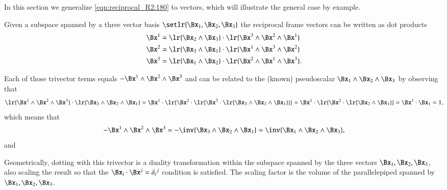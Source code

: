 %
%

In this section we generalize \cref{eqn:reciprocal_R2:180} to  vectors, which will illustrate the general case by example.

Given
a subspace spanned by a three vector basis \( \setlr{ \Bx_1, \Bx_2, \Bx_3 } \) the reciprocal frame vectors can be written as dot products
\begin{dmath}\label{eqn:reciprocal_R3:320}
\begin{aligned}
\Bx^1 &= \lr{ \Bx_2 \wedge \Bx_3 } \cdot \lr{ \Bx^3 \wedge \Bx^2 \wedge \Bx^1 } \\
\Bx^2 &= \lr{ \Bx_3 \wedge \Bx_1 } \cdot \lr{ \Bx^1 \wedge \Bx^3 \wedge \Bx^2 } \\
\Bx^3 &= \lr{ \Bx_1 \wedge \Bx_2 } \cdot \lr{ \Bx^2 \wedge \Bx^1 \wedge \Bx^3 }.
\end{aligned}
\end{dmath}

Each of those trivector terms equals \( - \Bx^1 \wedge \Bx^2 \wedge \Bx^3 \) and can be related to the (known) pseudoscalar \( \Bx_1 \wedge \Bx_2 \wedge \Bx_3 \) by observing that
\begin{dmath}\label{eqn:reciprocal_R3:340}
\lr{ \Bx^1 \wedge \Bx^2 \wedge \Bx^3 } \cdot \lr{ \Bx_3 \wedge \Bx_2 \wedge \Bx_1 }
=
\Bx^1 \cdot \lr{ \Bx^2 \cdot \lr{ \Bx^3 \cdot \lr{ \Bx_3 \wedge \Bx_2 \wedge \Bx_1 } }}
=
\Bx^1 \cdot \lr{ \Bx^2 \cdot \lr{ \Bx_2 \wedge \Bx_1 } }
=
\Bx^1 \cdot \Bx_1
=
1,
\end{dmath}
which means that
\begin{dmath}\label{eqn:reciprocal_R3:360}
-\Bx^1 \wedge \Bx^2 \wedge \Bx^3
= -\inv{ \Bx_3 \wedge \Bx_2 \wedge \Bx_1 }
= \inv{ \Bx_1 \wedge \Bx_2 \wedge \Bx_3 },
\end{dmath}
and

Geometrically, dotting with this trivector is a duality transformation within the subspace spanned by the three vectors \( \Bx_1, \Bx_2, \Bx_3 \), also scaling the result so that the \( \Bx_i \cdot \Bx^j = {\delta_i}^j \) condition is satisfied.  The scaling factor is the volume of the parallelepiped spanned by \( \Bx_1, \Bx_2, \Bx_3 \).
